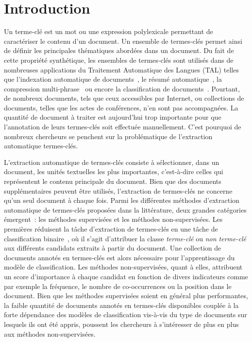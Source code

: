 \section{Introduction}
\label{sec:introduction}
  Un terme-clé est un mot ou une expression polylexicale permettant de
  caractériser le contenu d'un document. Un ensemble de termes-clés permet ainsi
  de définir les principales thématiques abordées dans un document. Du fait de
  cette propriété synthétique, les ensembles de termes-clés sont utilisés dans
  de nombreuses applications du Traitement Automatique des Langues (TAL) telles
  que l'indexation automatique de documents~\cite{medelyan2008smalltrainingset},
  le résumé automatique~\cite{avanzo2005keyphrase}, la compression
  multi-phrase~\cite{boudin2013multisentencecompression} ou encore la
  classification de documents~\cite{han2007webdocumentclustering}.
  Pourtant, de nombreux documents, tels que ceux accessibles par Internet, ou
  collections de documents, telles que les actes de conférences, n'en sont pas
  accompagnées. La quantité de document à traiter est aujourd'hui trop
  importante pour que l'annotation de leurs termes-clés soit effectuée
  manuellement. C'est pourquoi de nombreux chercheurs se penchent sur la
  problématique de l'extraction automatique termes-clés.

  L'extraction automatique de termes-clés consiste à sélectionner, dans un
  document, les unités textuelles les plus importantes, c'est-à-dire celles qui
  représentent le contenu principale du document. Bien que des documents
  supplémentaires peuvent être utilisés, l'extraction de termes-clés ne concerne
  qu'un seul document à chaque fois. Parmi les différentes méthodes d'extraction
  automatique de termes-clés proposées dans la littérature, deux grandes
  catégories émergent~: les méthodes supervisées et les méthodes
  non-supervisées. Les premières réduisent la tâche d'extraction de termes-clés
  en une tâche de classification binaire~\cite{witten1999kea}, où il s'agit
  d'attribuer la classe \og{}\textit{terme-clé}\fg{} ou \og{}\textit{non
  terme-clé}\fg{} aux différents candidats extraits à partir du document. Une
  collection de documents annotés en termes-clés est alors nécessaire pour
  l'apprentissage du modèle de classification. Les méthodes non-supervisées,
  quant à elles, attribuent un score d'importance à chaque candidat en fonction
  de divers indicateurs comme par exemple la fréquence, le nombre de
  co-occurrences ou la position dans le document. Bien que les méthodes
  supervisées soient en général plus performantes, la faible quantité de
  documents annotés en termes-clés disponibles couplée à la forte dépendance des
  modèles de classification vis-à-vis du type de documents sur lesquels ils ont
  été appris, poussent les chercheurs à s'intéresser de plus en plus aux
  méthodes non-supervisées.

